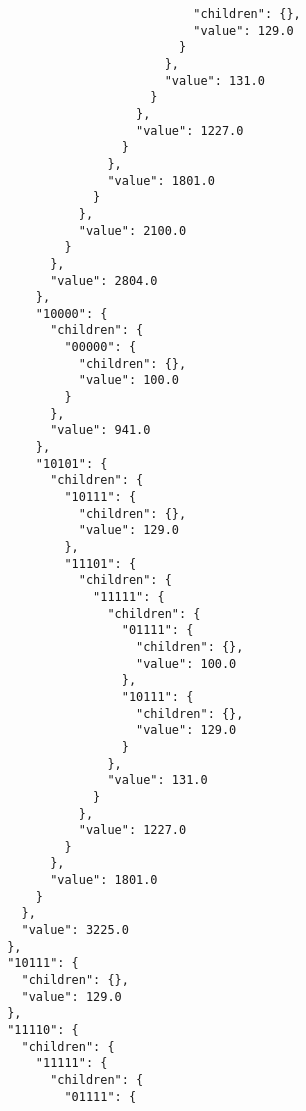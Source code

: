 \documentclass{article}
\begin{document}
\begin{listing}
\begin{verbatim}
                                              "children": {},
                                              "value": 129.0
                                            }
                                          },
                                          "value": 131.0
                                        }
                                      },
                                      "value": 1227.0
                                    }
                                  },
                                  "value": 1801.0
                                }
                              },
                              "value": 2100.0
                            }
                          },
                          "value": 2804.0
                        },
                        "10000": {
                          "children": {
                            "00000": {
                              "children": {},
                              "value": 100.0
                            }
                          },
                          "value": 941.0
                        },
                        "10101": {
                          "children": {
                            "10111": {
                              "children": {},
                              "value": 129.0
                            },
                            "11101": {
                              "children": {
                                "11111": {
                                  "children": {
                                    "01111": {
                                      "children": {},
                                      "value": 100.0
                                    },
                                    "10111": {
                                      "children": {},
                                      "value": 129.0
                                    }
                                  },
                                  "value": 131.0
                                }
                              },
                              "value": 1227.0
                            }
                          },
                          "value": 1801.0
                        }
                      },
                      "value": 3225.0
                    },
                    "10111": {
                      "children": {},
                      "value": 129.0
                    },
                    "11110": {
                      "children": {
                        "11111": {
                          "children": {
                            "01111": {

\end{verbatim}
\end{listing}
\end{document}
